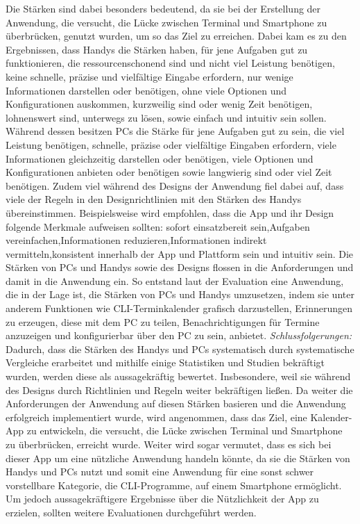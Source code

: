 	Die Stärken sind dabei besonders bedeutend, da sie bei der Erstellung der Anwendung, die versucht, die Lücke zwischen Terminal und Smartphone zu überbrücken, genutzt wurden, um so das Ziel zu erreichen.
		Dabei kam es zu den Ergebnissen, dass Handys die Stärken haben, für jene Aufgaben gut zu funktionieren, die ressourcenschonend sind und nicht viel Leistung benötigen, keine schnelle, präzise und vielfältige Eingabe erfordern, nur wenige Informationen darstellen oder benötigen, ohne viele Optionen und Konfigurationen auskommen, kurzweilig sind oder wenig Zeit benötigen, lohnenswert sind, unterwegs zu lösen, sowie einfach und intuitiv sein sollen. 
		\newline%
		Während dessen besitzen PCs die Stärke für jene Aufgaben gut zu sein, die viel Leistung benötigen, schnelle, präzise oder vielfältige Eingaben erfordern, viele Informationen gleichzeitig darstellen oder benötigen, viele Optionen und Konfigurationen anbieten oder benötigen sowie langwierig sind oder viel Zeit benötigen.
		\newline%
		Zudem viel während des Designs der Anwendung fiel dabei auf, dass viele der Regeln in den Designrichtlinien mit den Stärken des Handys übereinstimmen. Beispielsweise wird empfohlen, dass die App und ihr Design folgende Merkmale aufweisen sollten: \glqq sofort einsatzbereit sein\grqq{},\glqq Aufgaben vereinfachen\grqq{},\glqq Informationen reduzieren\grqq{},\glqq Informationen indirekt vermitteln\grqq{},\glqq konsistent innerhalb der App und Plattform sein\grqq{} und \glqq intuitiv sein\grqq{}.
	\newline
	Die Stärken von PCs und Handys sowie des Designs flossen in die Anforderungen und damit in die Anwendung ein. So entstand laut der Evaluation eine Anwendung, die in der Lage ist, die Stärken von PCs und Handys umzusetzen, indem sie unter anderem Funktionen wie CLI-Terminkalender grafisch darzustellen, Erinnerungen zu erzeugen, diese mit dem PC zu teilen, Benachrichtigungen für Termine anzuzeigen und konfigurierbar über den PC zu sein, anbietet.
\newline%
\myNewSection
\textit{Schlussfolgerungen:} 
Dadurch, dass die Stärken des Handys und PCs systematisch durch systematische Vergleiche erarbeitet und mithilfe einige Statistiken und Studien bekräftigt wurden, werden diese als aussagekräftig bewertet. Insbesondere, weil sie während des Designs durch Richtlinien und Regeln weiter bekräftigen ließen.
	Da weiter die Anforderungen der Anwendung auf diesen Stärken basieren und die Anwendung erfolgreich implementiert wurde, wird angenommen, dass das Ziel, eine Kalender-App zu entwickeln, die versucht, die Lücke zwischen Terminal und Smartphone zu überbrücken, erreicht wurde. Weiter wird sogar vermutet, dass es sich bei dieser App um eine nützliche Anwendung handeln könnte, da sie die Stärken von Handys und PCs nutzt und somit eine Anwendung für eine sonst schwer vorstellbare Kategorie, die CLI-Programme, auf einem Smartphone ermöglicht.  Um jedoch aussagekräftigere Ergebnisse über die Nützlichkeit der App zu erzielen, sollten weitere Evaluationen durchgeführt werden.

